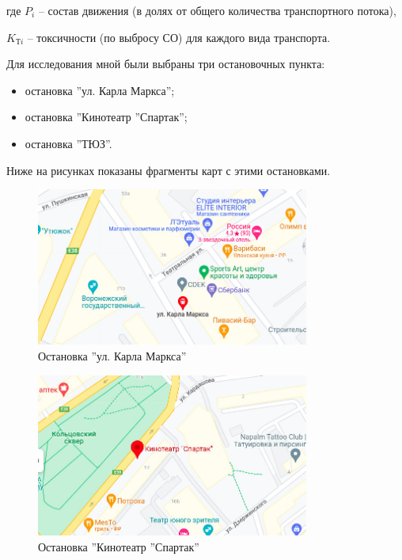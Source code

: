 \par где $P_{i}$ – состав движения (в долях от общего количества транспортного потока),
\par $K_{\text{Т}i}$ – токсичности (по выбросу СО) для каждого вида транспорта.



Для исследования мной были выбраны три остановочных пункта:
\begin{itemize}
\item остановка ''ул. Карла Маркса'';
\item остановка ''Кинотеатр ''Спартак'';
\item остановка ''ТЮЗ''.
\end{itemize}

Ниже на рисунках показаны фрагменты карт с этими остановками.

\begin{figure}[H]%
  \centering
  \includegraphics[width=0.8\textwidth]{src/st_k_marks.jpg}
  \caption{Остановка ''ул. Карла Маркса''} \label{p:k_marks}
\end{figure}%

\begin{figure}[H]%
  \centering
  \includegraphics[width=0.8\textwidth]{src/st_spartak.jpg}
  \caption{Остановка ''Кинотеатр ''Спартак''} \label{p:spartak}
\end{figure}%

